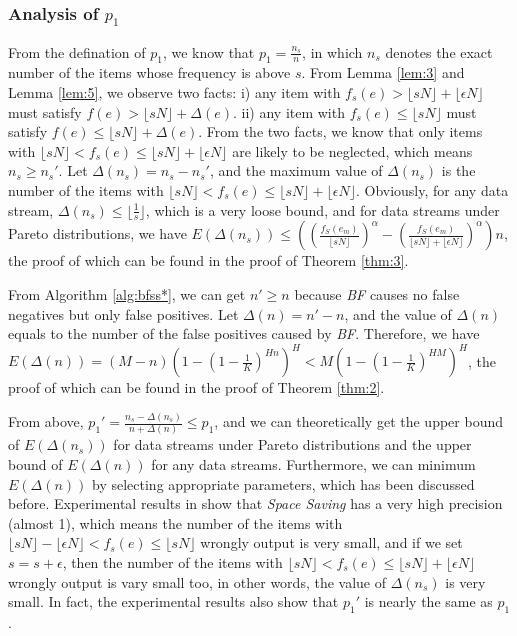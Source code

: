 \documentclass[conference]{IEEEtran}
\begin{document}
\subsubsection{\textbf{Analysis of $p_1$}}
From the defination of $p_1$, we know that $p_1=\frac{n_s}{n}$, in which $n_s$ denotes the exact number of the items whose frequency is above $s$. From Lemma \ref{lem:3} and Lemma \ref{lem:5}, we observe two facts: i) any item with $f_s(e)>\lfloor sN\rfloor+\lfloor \epsilon N\rfloor$ must satisfy $f(e)>\lfloor sN\rfloor+\Delta(e)$. ii) any item with $f_s(e)\leq\lfloor sN\rfloor$ must satisfy $f(e)\leq\lfloor sN\rfloor+\Delta(e)$. From the two facts, we know that only items with $\lfloor sN\rfloor<f_s(e)\leq \lfloor sN\rfloor+\lfloor \epsilon N\rfloor$ are likely to be neglected, which means $n_s\geq n_s'$. Let $\Delta(n_s)=n_s-n_s'$, and the maximum value of $\Delta(n_s)$  is the number of the items with $\lfloor sN\rfloor<f_s(e)\leq \lfloor sN\rfloor+\lfloor \epsilon N\rfloor$. Obviously, for any data stream, $\Delta(n_s)\leq\lfloor\frac{1}{s}\rfloor$, which is a very loose bound, and for data streams under Pareto distributions, we have $E(\Delta(n_s))\leq((\frac{f_S(e_m)}{\lfloor sN\rfloor})^\alpha-(\frac{f_S(e_m)}{\lfloor sN\rfloor+\lfloor \epsilon N\rfloor})^\alpha)n$, the proof of which can be found in the proof of Theorem \ref{thm:3}.\par
From Algorithm \ref{alg:bfss*}, we can get $n'\geq n$ because \emph{BF} causes no false negatives but only false positives. Let $\Delta(n)=n'-n$, and the value of $\Delta(n)$ equals to the number of the false positives caused by \emph{BF}. Therefore, we have $E(\Delta(n))=(M-n)(1-(1-\frac{1}{K})^{Hn})^H<M(1-(1-\frac{1}{K})^{HM})^H$, the proof of which can be found in the proof of Theorem \ref{thm:2}.\par
From above, $p_1'=\frac{n_s-\Delta(n_s)}{n+\Delta(n)}\leq p_1$, and we can theoretically get the upper bound of $E(\Delta(n_s))$ for data streams under Pareto distributions and the upper bound of $E(\Delta(n))$ for any data streams. Furthermore, we can minimum $E(\Delta(n))$ by selecting appropriate parameters, which has been discussed before. Experimental results in \cite{IEEEexample:overview,IEEEexample:overview_vldbj} show that \emph{Space Saving} has a very high precision (almost 1), which means the number of the items with $\lfloor sN\rfloor-\lfloor \epsilon N\rfloor<f_s(e)\leq\lfloor sN\rfloor$ wrongly output is very small, and if we set $s=s+\epsilon$, then the number of the items with $\lfloor sN\rfloor<f_s(e)\leq\lfloor sN\rfloor+\lfloor \epsilon N\rfloor$ wrongly output is vary small too, in other words, the value of $\Delta(n_s)$ is very small. In fact, the experimental results also show that $p_1'$ is nearly the same as $p_1$.
\end{document}
